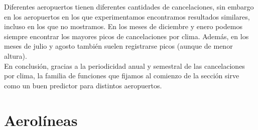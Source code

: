 Diferentes aeropuertos tienen diferentes cantidades de cancelaciones, sin embargo en los aeropuertos en los que experimentamos encontramos resultados similares, incluso en los que no mostramos. En los meses de diciembre y enero podemos siempre encontrar los mayores picos de cancelaciones por clima. Además, en los meses de julio y agosto también suelen registrarse picos (aunque de menor altura). \\

En conclusión, gracias a la periodicidad anual y semestral de las cancelaciones por clima, la familia de funciones que fijamos al comienzo de la sección sirve como un buen predictor para distintos aeropuertos. \\

\section{Aerolíneas}



